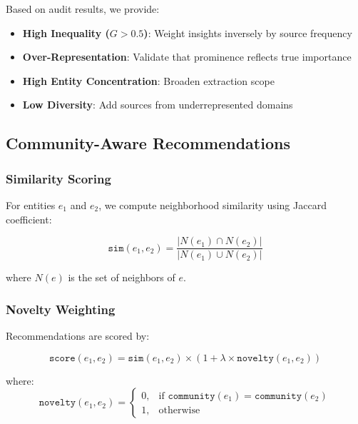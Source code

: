 \documentclass[11pt,twocolumn]{article}
\begin{document}
Based on audit results, we provide:

\begin{itemize}
\item \textbf{High Inequality ($G > 0.5$)}: Weight insights inversely by source frequency
\item \textbf{Over-Representation}: Validate that prominence reflects true importance
\item \textbf{High Entity Concentration}: Broaden extraction scope
\item \textbf{Low Diversity}: Add sources from underrepresented domains
\end{itemize}

\subsection{Community-Aware Recommendations}

\subsubsection{Similarity Scoring}

For entities $e_1$ and $e_2$, we compute neighborhood similarity using Jaccard coefficient:

\begin{equation}
\texttt{sim}(e_1, e_2) = \frac{|N(e_1) \cap N(e_2)|}{|N(e_1) \cup N(e_2)|}
\label{eq:jaccard}
\end{equation}

where $N(e)$ is the set of neighbors of $e$.

\subsubsection{Novelty Weighting}

Recommendations are scored by:

\begin{equation}
\texttt{score}(e_1, e_2) = \texttt{sim}(e_1, e_2) \times (1 + \lambda \times \texttt{novelty}(e_1, e_2))
\label{eq:novelty-score}
\end{equation}

where:
\begin{equation}
\texttt{novelty}(e_1, e_2) = \begin{cases}
0, & \text{if } \texttt{community}(e_1) = \texttt{community}(e_2) \\
1, & \text{otherwise}
\end{cases}
\end{equation}
\end{document}
